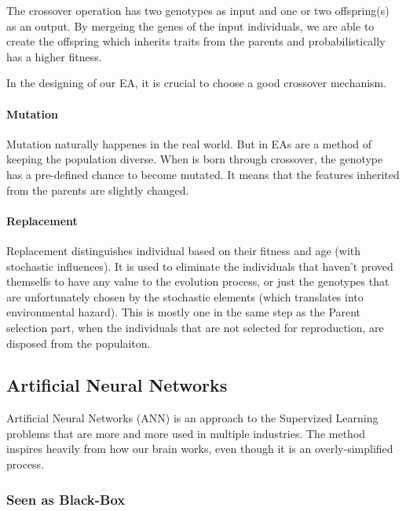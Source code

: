 \documentclass[11pt]{article}
\begin{document}
The crossover operation has two genotypes as input and one or two
offspring(s) as an output. By mergeing the genes of the input
individuals, we are able to create the offspring which inherits traits
from the parents and probabilistically has a higher fitness.

In the designing of our EA, it is crucial to choose a good crossover
mechanism.

\hypertarget{mutation}{%
\paragraph{Mutation}\label{mutation}}

Mutation naturally happenes in the real world. But in EAs are a method
of keeping the population diverse. When is born through crossover, the
genotype has a pre-defined chance to become mutated. It means that the
features inherited from the parents are slightly changed.

\hypertarget{replacement}{%
\paragraph{Replacement}\label{replacement}}

Replacement distinguishes individual based on their fitness and age
(with stochastic influences). It is used to eliminate the individuals
that haven't proved themselfs to have any value to the evolution
process, or just the genotypes that are unfortunately chosen by the
stochastic elements (which translates into environmental hazard). This
is mostly one in the same step as the Parent selection part, when the
individuals that are not selected for reproduction, are disposed from
the populaiton.

    \hypertarget{artificial-neural-networks}{%
\subsection{Artificial Neural
Networks}\label{artificial-neural-networks}}

Artificial Neural Networks (ANN) is an approach to the Supervized
Learning problems that are more and more used in multiple industries.
The method inspires heavily from how our brain works, even though it is
an overly-simplified process.

\hypertarget{seen-as-black-box}{%
\subsubsection*{Seen as Black-Box}\label{seen-as-black-box}}
\end{document}
